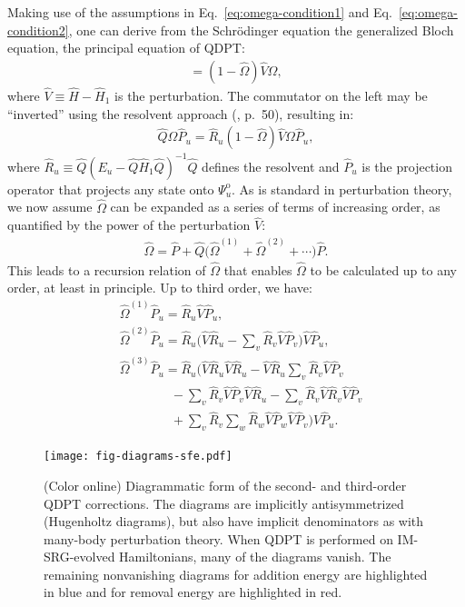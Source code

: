 \documentclass[aip, jcp, 12pt]{revtex4-1}
\begin{document}
Making use of the assumptions in Eq.\ \eqref{eq:omega-condition1} and Eq.\ \eqref{eq:omega-condition2}, one can derive from the Schr\"odinger equation the generalized Bloch equation, the principal equation of QDPT:
\begin{gather*}
  [\hat \Omega, \hat{H}_1] =
  (1 - \hat \Omega) \hat V \Omega,
\end{gather*}
where $\hat V \equiv \hat H - \hat{H}_1$ is the perturbation.  The commutator on the left may be ``inverted'' using the resolvent approach (\cite{shavitt2009many}, p.\ 50), resulting in:
\begin{align*}
  \hat Q \Omega \hat P_u =
  \hat R_u (1 - \hat \Omega) \hat V \Omega \hat P_u,
\end{align*}
where $\hat R_u \equiv \hat Q (E_u - \hat Q \hat{H}_1 \hat Q)^{-1} \hat Q$ defines the resolvent and $\hat P_u$ is the projection operator that projects any state onto $\Psi^{\mathrm{o}}_u$.  As is standard in perturbation theory, we now assume $\hat \Omega$ can be expanded as a series of terms of increasing order, as quantified by the power of the perturbation $\hat V$:
\begin{align*}
  \hat \Omega = \hat P +
  \hat Q\bigl(\hat \Omega^{(1)} + \hat \Omega^{(2)} + \cdots\bigr) \hat P.
\end{align*}
This leads to a recursion relation of $\hat \Omega$ that enables $\hat \Omega$ to be calculated up to any order, at least in principle.  Up to third order, we have:
\begin{align*}
  &\hat \Omega^{(1)} \hat P_u = \hat R_u \hat V \hat P_u, \\
  &\hat \Omega^{(2)} \hat P_u =
    \hat R_u \biggl(
    \hat V \hat R_u
    - \sum_v \hat R_v \hat V \hat P_v
    \biggr) \hat V \hat P_u, \\
  &\hat \Omega^{(3)} \hat P_u =
    \hat R_u \biggl(
    \hat V \hat R_u \hat V \hat R_u
    - \hat V \hat R_u \sum_v \hat R_v \hat V \hat P_v \\
  &\qquad\qquad
    - \sum_v \hat R_v \hat V \hat P_v \hat V \hat R_u
    - \sum_v \hat R_v \hat V \hat R_v \hat V \hat P_v \\
  &\qquad\qquad
    + \sum_v \hat R_v \sum_w \hat R_w \hat V \hat P_w \hat V \hat P_v
    \biggr) \hat V \hat P_u.
\end{align*}

\begin{figure}
\texttt{[image: fig-diagrams-sfe.pdf]}
\caption{(Color online) Diagrammatic form of the second- and third-order QDPT corrections.  The diagrams are implicitly antisymmetrized (Hugenholtz diagrams), but also have implicit denominators as with many-body perturbation theory.  When QDPT is performed on IM-SRG-evolved Hamiltonians, many of the diagrams vanish.  The remaining nonvanishing diagrams for addition energy are highlighted in blue and for removal energy are highlighted in red.}
\label{fig:diagrams-sfe}
\end{figure}
\end{document}
